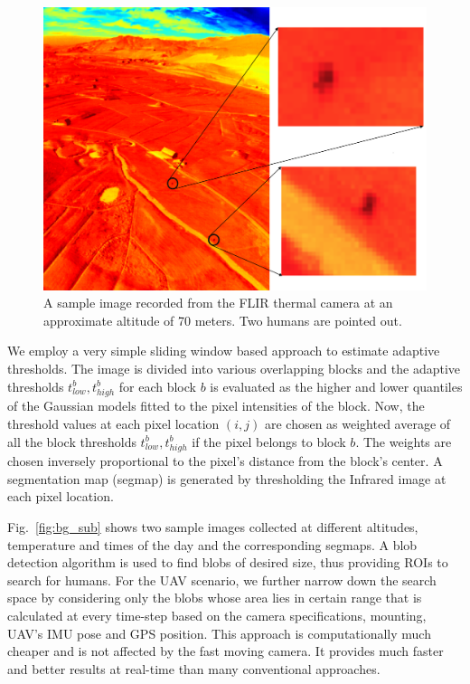 \documentclass[runningheads]{llncs}
\begin{document}
\begin{figure}
\centerline{\includegraphics[scale=0.3]{img/sample_thermal.png}}
\caption{A sample image recorded from the FLIR thermal camera at an approximate altitude of 70 meters. Two humans are pointed out.}
\label{fig:thermal_sample}
\end{figure}

We employ a very simple sliding window based approach to estimate adaptive thresholds. The image is divided into various overlapping blocks and the adaptive thresholds $t_{low}^b, t_{high}^b$ for each block $b$ is evaluated as the higher and lower quantiles of the Gaussian models fitted to the pixel intensities of the block. Now, the threshold values at each pixel location $(i, j)$ are chosen as weighted average of all the block thresholds $t_{low}^b, t_{high}^b$ if the pixel belongs to block $b$. The weights are chosen inversely proportional to the pixel's distance from the block's center. A segmentation map (segmap) is generated by thresholding the Infrared image at each pixel location.

Fig.~\ref{fig:bg_sub} shows two sample images collected at different altitudes, temperature and times of the day and the corresponding segmaps. A blob detection algorithm \cite{cvblob} is used to find blobs of desired size, thus providing ROIs to search for humans. For the UAV scenario, we further narrow down the search space by considering only the blobs whose area lies in certain range that is calculated at every time-step based on the camera specifications, mounting, UAV's IMU pose and GPS position. This approach is computationally much cheaper and is not affected by the fast moving camera. It provides much faster and better results at real-time than many conventional approaches.
\end{document}
